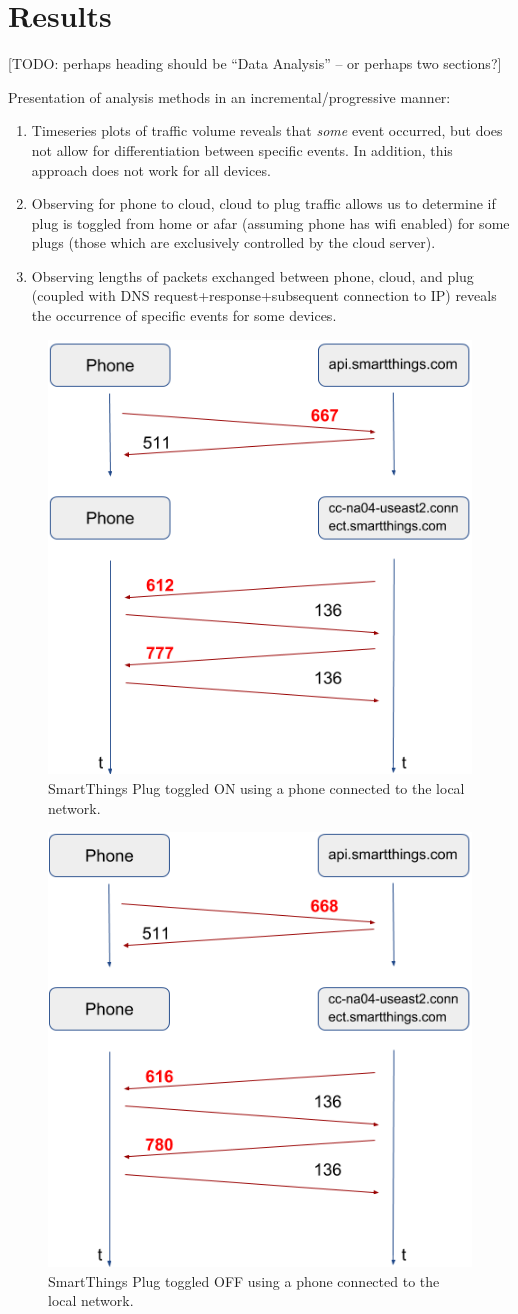 \section{Results}
\label{sect:results}
{\color{red}[TODO: perhaps heading should be ``Data Analysis'' -- or perhaps two sections?]}

{\color{red}
Presentation of analysis methods in an incremental/progressive manner:
\begin{enumerate}
\item Timeseries plots of traffic volume reveals that \emph{some} event occurred, but does not allow for differentiation between specific events. In addition, this approach does not work for all devices.
\item Observing for phone to cloud, cloud to plug traffic allows us to determine if plug is toggled from home or afar (assuming phone has wifi enabled) for some plugs (those which are exclusively controlled by the cloud server).
\item Observing lengths of packets exchanged between phone, cloud, and plug (coupled with DNS request+response+subsequent connection to IP) reveals the occurrence of specific events for some devices.
\end{enumerate}
}

\begin{figure}
  \caption{SmartThings Plug toggled ON using a phone connected to the local network.}
  \label{fig:st-plug-on-local-phone}
  \centering
    \includegraphics[width=0.5\linewidth]{figures/ST-plug-ON-local-phone.png}
\end{figure}

\begin{figure}
  \caption{SmartThings Plug toggled OFF using a phone connected to the local network.}
  \label{fig:st-plug-off-local-phone}
  \centering
    \includegraphics[width=0.5\linewidth]{figures/ST-plug-OFF-local-phone.png}
\end{figure}


